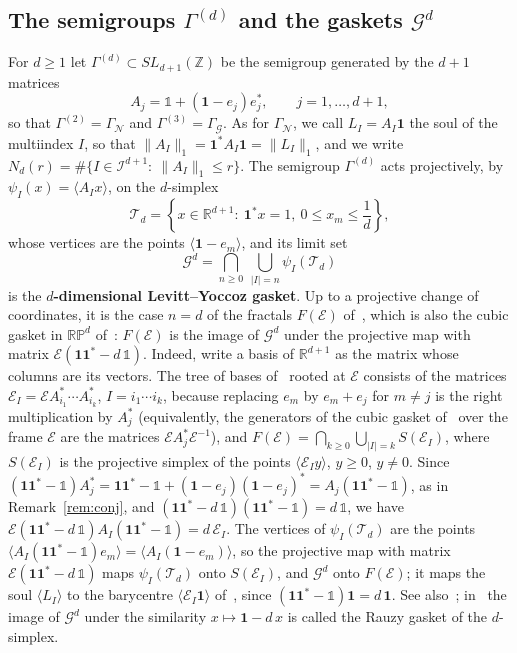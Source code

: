 \documentclass[11pt]{amsart}
\newcommand{\id}{\mathds{1}}
\theoremstyle{definition}
\theoremstyle{remark}
\newcommand{\one}{\mathbf 1}
\newcommand{\R}{\mathbb R}
\newcommand{\Z}{\mathbb Z}
\newcommand{\RP}{\mathbb{RP}}
\newcommand{\cI}{\mathcal I}
\newcommand{\cT}{\mathcal T}
\newcommand{\GN}{\Gamma_{\mathcal N}}
\newcommand{\GG}{\Gamma_{\mathcal G}}
\newcommand{\abs}[1]{\lvert #1\rvert}
\newcommand{\norm}[1]{\lVert #1\rVert}
\newcommand{\pr}[1]{\langle #1\rangle}
\begin{document}
\subsection*{The semigroups \texorpdfstring{$\Gamma^{(d)}$}{Gamma(d)} and the gaskets \texorpdfstring{$\mathcal G^d$}{G\^{}d}}
For $d\ge1$ let $\Gamma^{(d)}\subset SL_{d+1}(\Z)$ be the semigroup generated by the $d+1$ matrices
\[
  A_j=\id+(\one-e_j)e_j^*,\qquad j=1,\dots,d+1,
\]
so that $\Gamma^{(2)}=\GN$ and $\Gamma^{(3)}=\GG$. As for $\GN$, we call $L_I=A_I\one$ the soul of the multiindex $I$, so that $\norm{A_I}_1=\one^*A_I\one=\norm{L_I}_1$, and we write $N_d(r)=\#\{I\in\cI^{d+1}:\ \norm{A_I}_1\le r\}$.
The semigroup $\Gamma^{(d)}$ acts projectively, by $\psi_I(x)=\pr{A_Ix}$, on the $d$-simplex
\[
  \cT_d=\left\{x\in\R^{d+1}:\ \one^*x=1,\ 0\le x_m\le\frac1d\right\},
\]
whose vertices are the points $\pr{\one-e_m}$, and its limit set
\[
  \mathcal G^d=\bigcap_{n\ge0}\ \bigcup_{\abs I=n}\psi_I(\cT_d)
\]
is the \textbf{$d$-dimensional Levitt--Yoccoz gasket}. Up to a projective change of coordinates, it is the case $n=d$ of the fractals $F(\mathcal E)$ of~\cite{DL08}, which is also the cubic gasket in $\RP^d$ of~\cite{DL15JGA}: $F(\mathcal E)$ is the image of $\mathcal G^d$ under the projective map with matrix $\mathcal E(\one\one^*-d\,\id)$. Indeed, write a basis of $\R^{d+1}$ as the matrix whose columns are its vectors. The tree of bases of~\cite[\S2]{DL08} rooted at $\mathcal E$ consists of the matrices $\mathcal E_I=\mathcal EA_{i_1}^*\cdots A_{i_k}^*$, $I=i_1\cdots i_k$, because replacing $e_m$ by $e_m+e_j$ for $m\ne j$ is the right multiplication by $A_j^*$ (equivalently, the generators of the cubic gasket of~\cite{DL15JGA} over the frame $\mathcal E$ are the matrices $\mathcal EA_j^*\mathcal E^{-1}$), and $F(\mathcal E)=\bigcap_{k\ge0}\bigcup_{\abs I=k}S(\mathcal E_I)$, where $S(\mathcal E_I)$ is the projective simplex of the points $\pr{\mathcal E_Iy}$, $y\ge0$, $y\ne0$. Since $(\one\one^*-\id)A_j^*=\one\one^*-\id+(\one-e_j)(\one-e_j)^*=A_j(\one\one^*-\id)$, as in Remark~\ref{rem:conj}, and $(\one\one^*-d\,\id)(\one\one^*-\id)=d\,\id$, we have $\mathcal E(\one\one^*-d\,\id)A_I(\one\one^*-\id)=d\,\mathcal E_I$. The vertices of $\psi_I(\cT_d)$ are the points $\pr{A_I(\one\one^*-\id)e_m}=\pr{A_I(\one-e_m)}$, so the projective map with matrix $\mathcal E(\one\one^*-d\,\id)$ maps $\psi_I(\cT_d)$ onto $S(\mathcal E_I)$, and $\mathcal G^d$ onto $F(\mathcal E)$; it maps the soul $\pr{L_I}$ to the barycentre $\pr{\mathcal E_I\one}$ of~\cite{DL08}, since $(\one\one^*-\id)\one=d\,\one$. See also~\cite{AS13,Fou20}; in~\cite{Fou20} the image of $\mathcal G^d$ under the similarity $x\mapsto\one-d\,x$ is called the Rauzy gasket of the $d$-simplex.
\end{document}
